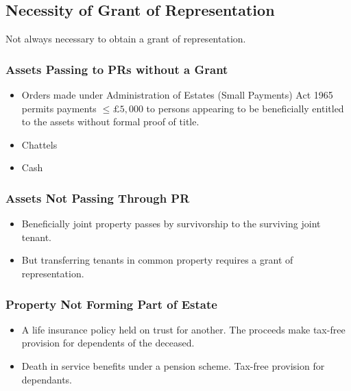 \documentclass[
]{article}
\providecommand{\tightlist}{%
  \setlength{\itemsep}{0pt}\setlength{\parskip}{0pt}}
\begin{document}
\hypertarget{necessity-of-grant-of-representation}{%
\subsection{Necessity of Grant of
Representation}\label{necessity-of-grant-of-representation}}

Not always necessary to obtain a grant of representation.

\hypertarget{assets-passing-to-prs-without-a-grant}{%
\subsubsection{Assets Passing to PRs without a
Grant}\label{assets-passing-to-prs-without-a-grant}}

\begin{itemize}
\tightlist
\item
  Orders made under Administration of Estates (Small Payments) Act 1965
  permits payments \(\leq £5,000\) to persons appearing to be
  beneficially entitled to the assets without formal proof of title.
\item
  Chattels
\item
  Cash
\end{itemize}

\hypertarget{assets-not-passing-through-pr}{%
\subsubsection{Assets Not Passing Through
PR}\label{assets-not-passing-through-pr}}

\begin{itemize}
\tightlist
\item
  Beneficially joint property passes by survivorship to the surviving
  joint tenant.
\item
  But transferring tenants in common property requires a grant of
  representation.
\end{itemize}

\hypertarget{property-not-forming-part-of-estate}{%
\subsubsection{Property Not Forming Part of
Estate}\label{property-not-forming-part-of-estate}}

\begin{itemize}
\tightlist
\item
  A life insurance policy held on trust for another. The proceeds make
  tax-free provision for dependents of the deceased.
\item
  Death in service benefits under a pension scheme. Tax-free provision
  for dependants.
\end{itemize}
\end{document}
